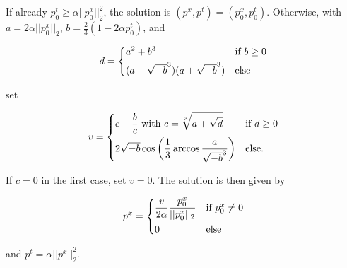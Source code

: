 
            \begin{algorithm}


                If already $p_{0}^{t} \ge \alpha ||p_{0}^{x}||_{2}^{2}$, the solution is $(p^{x}, p^{t}) = (p_{0}^{x}, p_{0}^{t})$. Otherwise, with $a = 2 \alpha ||p_{0}^{x}||_{2}$, $b = \frac{2}{3} (1 - 2 \alpha p_{0}^{t})$, and

                    \[
                        d =
                            \begin{dcases*}
                                a^{2} + b^{3} & \textnormal{if $b \ge 0$}\\
                                (a - \sqrt{-b}^{3})(a + \sqrt{-b}^{3}) & \textnormal{else}
                            \end{dcases*}
                    \]

                set

                    \[
                        v =
                            \begin{dcases*}
                                c - \frac{b}{c} \,\, \textnormal{with} \,\, c = \sqrt[3]{a + \sqrt{d}} & \textnormal{if $d \ge 0$}\\
                                2 \sqrt{-b} \cos \bigg( \frac{1}{3} \arccos \frac{a}{\sqrt{-b}^{3}} \bigg) & \textnormal{else}.
                            \end{dcases*}
                    \]

                If $c = 0$ in the first case, set $v = 0$. The solution is then given by

                    \[
                        p^{x} =
                            \begin{dcases*}
                                \frac{v}{2\alpha} \frac{p_{0}^{x}}{||p_{0}^{x}||_{2}} & \textnormal{if $p_{0}^{x} \ne 0$}\\
                                0 & \textnormal{else}
                            \end{dcases*}
                    \]

                and $p^{t} = \alpha ||p^{x}||_{2}^{2}$.
            \end{algorithm}

